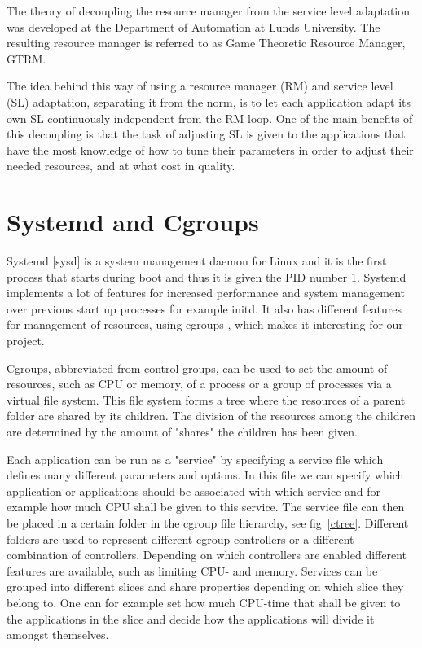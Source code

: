 \documentclass[nobiblatex]{LTHthesis}
\begin{document}
The theory of decoupling the resource manager from the service level adaptation was developed at the Department of Automation at Lunds University. The resulting resource manager is referred to as Game Theoretic Resource Manager, GTRM. 

The idea behind this way of using a resource manager (RM) and service level (SL) adaptation, separating it from the norm, is to let each application adapt its own SL continuously independent from the RM loop. One of the main benefits of this decoupling is that the task of adjusting SL is given to the applications that have the most knowledge of how to tune their parameters in order to adjust their needed resources, and at what cost in quality.

\section{Systemd and Cgroups}
Systemd [sysd] is a system management daemon for Linux and it is the first process that starts during boot and thus it is given the PID number 1. Systemd implements a lot of features for increased performance and system management over previous start up processes for example initd. It also has different features for management of resources, using cgroups \cite{cgroups}, which makes it interesting for our project. 

Cgroups, abbreviated from control groups, can be used to set the amount of resources, such as CPU or memory, of a process or a group of processes via a virtual file system. This file system forms a tree where the resources of a parent folder are shared by its children. The division of the resources among the children are determined by the amount of "shares" the children has been given. 

Each application can be run as a "service" by specifying a service file which defines many different parameters and options. In this file we can specify which application or applications should be associated with which service and for example how much CPU shall be given to this service. The service file can then be placed in a certain folder in the cgroup file hierarchy, see fig~\ref{ctree}. Different folders are used to represent different cgroup controllers or a different combination of controllers. Depending on which controllers are enabled different features are available, such as limiting CPU- and memory.   
 Services can be grouped into different slices and share properties depending on which slice they belong to.  
One can for example set how much CPU-time that shall be given to the applications in the slice and decide how the applications will divide it amongst themselves.
\end{document}
